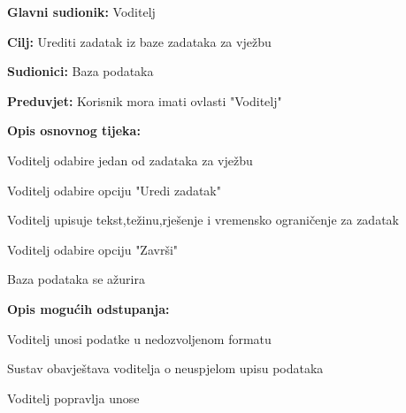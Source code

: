 					\noindent {}
					\begin{packed_item}
	
						\item \textbf{Glavni sudionik: } Voditelj
						\item  \textbf{Cilj:} Urediti zadatak iz baze zadataka za vježbu
						\item  \textbf{Sudionici:} Baza podataka
						\item  \textbf{Preduvjet:} Korisnik mora imati ovlasti "Voditelj"
						\item  \textbf{Opis osnovnog tijeka:}
						
						\item[] \begin{packed_enum}
	
							\item Voditelj odabire jedan od zadataka za vježbu 
							\item Voditelj odabire opciju "Uredi zadatak"
							\item Voditelj upisuje tekst,težinu,rješenje i vremensko ograničenje za zadatak
							\item Voditelj odabire opciju "Završi"
							\item Baza podataka se ažurira
						\end{packed_enum}

						\item  \textbf{Opis mogućih odstupanja:}
						
						\item[] \begin{packed_item}
	
							\item[2.a] Voditelj unosi podatke u nedozvoljenom formatu
							\item[] \begin{packed_enum}
								
								\item Sustav obavještava voditelja o neuspjelom upisu podataka
								\item Voditelj popravlja unose
								
							\end{packed_enum}
						\end{packed_item}
						
						
					\end{packed_item}

